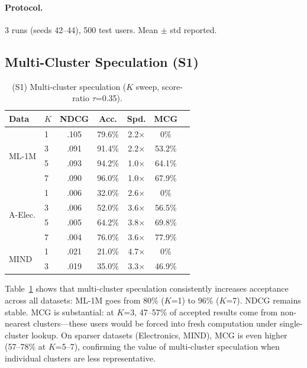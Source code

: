\documentclass[sigconf,nonacm=false]{acmart}
\begin{document}
\paragraph{Protocol.} 3 runs (seeds 42--44), 500 test users. Mean $\pm$ std reported.

\subsection{Multi-Cluster Speculation (S1)}
\label{sec:exp_s1}

\begin{table}[t]
\centering
\caption{(S1) Multi-cluster speculation ($K$ sweep, score-ratio $\tau$=0.35).}
\label{tab:s1}
\small
\begin{tabular}{ll ccccc}
\toprule
\textbf{Data} & $K$ & \textbf{NDCG} & \textbf{Acc.} & \textbf{Spd.} & \textbf{MCG} \\
\midrule
\multirow{4}{*}{ML-1M}
& 1 & .105 & 79.6\% & 2.2$\times$ & 0\% \\
& \cellcolor{gray!15} 3 & \cellcolor{gray!15} .091 & \cellcolor{gray!15} 91.4\% & \cellcolor{gray!15} 2.2$\times$ & \cellcolor{gray!15} 53.2\% \\
& 5 & .093 & 94.2\% & 1.0$\times$ & 64.1\% \\
& 7 & .090 & 96.0\% & 1.0$\times$ & 67.9\% \\
\midrule
\multirow{4}{*}{A-Elec.}
& 1 & .006 & 32.0\% & 2.6$\times$ & 0\% \\
& \cellcolor{gray!15} 3 & \cellcolor{gray!15} .006 & \cellcolor{gray!15} 52.0\% & \cellcolor{gray!15} 3.6$\times$ & \cellcolor{gray!15} 56.5\% \\
& 5 & .005 & 64.2\% & 3.8$\times$ & 69.8\% \\
& 7 & .004 & 76.0\% & 3.6$\times$ & 77.9\% \\
\midrule
\multirow{2}{*}{MIND}
& 1 & .021 & 21.0\% & 4.7$\times$ & 0\% \\
& \cellcolor{gray!15} 3 & \cellcolor{gray!15} .019 & \cellcolor{gray!15} 35.0\% & \cellcolor{gray!15} 3.3$\times$ & \cellcolor{gray!15} 46.9\% \\
\bottomrule
\end{tabular}
\end{table}

Table~\ref{tab:s1} shows that multi-cluster speculation consistently increases acceptance across all datasets: ML-1M goes from 80\% ($K$=1) to 96\% ($K$=7). NDCG remains stable. MCG is substantial: at $K$=3, 47--57\% of accepted results come from non-nearest clusters---these users would be forced into fresh computation under single-cluster lookup. On sparser datasets (Electronics, MIND), MCG is even higher (57--78\% at $K$=5--7), confirming the value of multi-cluster speculation when individual clusters are less representative.
\end{document}
